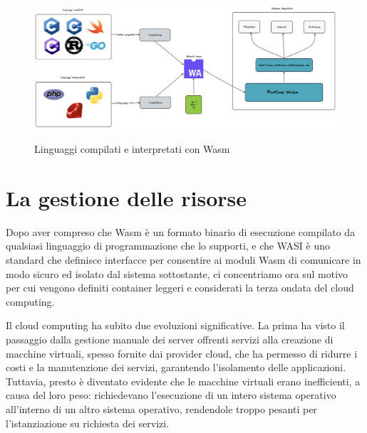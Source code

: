 \begin{figure}[h]
    \centering
    \captionsetup{justification=centering}
    \includegraphics[width=15cm]{./chapters/2.wasi-in-depth/images/9.portability_wasm.png}
    \label{wasm_wasi_portability}
    \caption{Linguaggi compilati e interpretati con Wasm}
\end{figure}


\section{La gestione delle risorse}
Dopo aver compreso che Wasm è un formato binario di esecuzione compilato da qualsiasi linguaggio di programmazione che
lo supporti, e che WASI è uno standard che definisce interfacce per consentire ai moduli Wasm di comunicare in modo
sicuro ed isolato dal sistema sottostante, ci concentriamo ora sul motivo per cui vengono definiti container leggeri e
considerati la terza ondata del cloud computing.

Il cloud computing ha subito due evoluzioni significative. La prima ha visto il passaggio dalla gestione manuale dei
server offrenti servizi alla creazione di macchine virtuali, spesso fornite dai provider cloud, che ha permesso di
ridurre i costi e la manutenzione dei servizi, garantendo l'isolamento delle applicazioni. Tuttavia, presto è diventato
evidente che le macchine virtuali erano inefficienti, a causa del loro peso: richiedevano l'esecuzione di un intero
sistema operativo all'interno di un altro sistema operativo, rendendole troppo pesanti per l'istanziazione su richiesta
dei servizi.

